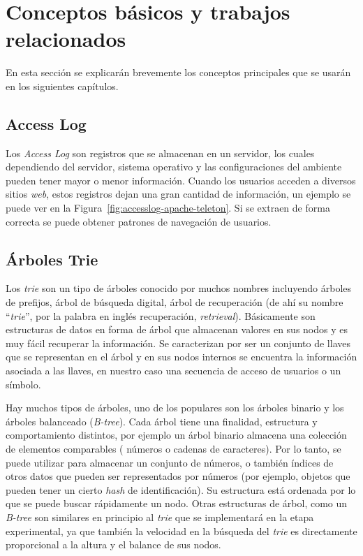 \section[Conceptos Básicos]{Conceptos básicos y trabajos relacionados} \label{sec:Conceptos-Basicos}


En esta sección se explicarán brevemente los conceptos principales que se usarán en los siguientes capítulos.




\subsection{Access Log}\label{concept-accesslog}

Los \emph{Access Log} son registros que se almacenan en un servidor, los cuales dependiendo del servidor, sistema operativo y las configuraciones del ambiente pueden tener mayor o menor información. Cuando los usuarios acceden a diversos sitios \emph{web}, estos registros dejan una gran cantidad de información, un ejemplo se puede ver en la Figura~\ref{fig:accesslog-apache-teleton}. Si se extraen de forma correcta se puede obtener patrones de navegación de usuarios. 


\subsection{Árboles Trie} \label{concept-trie}

Los \emph{trie} son un tipo de árboles conocido por muchos nombres incluyendo árboles de prefijos, árbol de búsqueda digital, árbol de recuperación (de ahí su nombre ``\emph{trie}'', por la palabra en inglés recuperación, \emph{retrieval}). Básicamente son estructuras de datos en forma de árbol que almacenan valores en sus nodos y es muy fácil recuperar la información. Se caracterizan por ser un conjunto de llaves que se representan en el árbol y en sus nodos internos se encuentra la información asociada a las llaves, en nuestro caso una secuencia de acceso de usuarios o un símbolo. 

Hay muchos tipos de árboles, uno de los populares son los árboles binario y los árboles balanceado (\emph{B-tree}). Cada árbol tiene una finalidad, estructura y comportamiento distintos, por ejemplo un árbol binario almacena una colección de elementos comparables ( números o cadenas de caracteres). Por lo tanto, se puede utilizar para almacenar un conjunto de números, o también  índices de otros datos que pueden ser representados por números (por ejemplo, objetos que pueden tener un cierto \emph{hash} de identificación). Su estructura está ordenada por lo que se puede buscar rápidamente un nodo. Otras estructuras de árbol, como un \emph{B-tree} son similares en principio al \emph{trie} que se implementará en la etapa experimental, ya que también la velocidad en la búsqueda del \emph{trie} es directamente proporcional a la altura y el balance de sus nodos.

